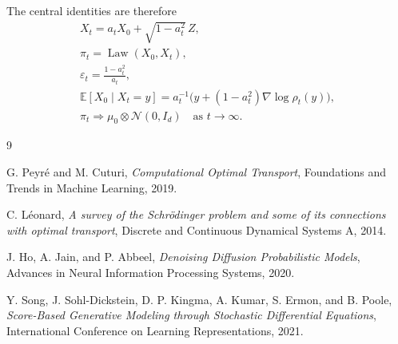 \documentclass[11pt]{article}
\theoremstyle{remark}
\newcommand{\E}{\mathbb{E}}
\newcommand{\N}{\mathcal{N}}
\newcommand{\Law}{\operatorname{Law}}
\begin{document}
The central identities are therefore
\begin{equation}
  \boxed{
  \begin{gathered}
  X_t=a_tX_0+\sqrt{1-a_t^2}\,Z,\\
  \pi_t=\Law(X_0,X_t),\\
  \varepsilon_t=\frac{1-a_t^2}{a_t},\\
  \E[X_0\mid X_t=y]
  =a_t^{-1}\bigl(y+(1-a_t^2)\nabla\log\rho_t(y)\bigr),\\
  \pi_t\Longrightarrow\mu_0\otimes\N(0,I_d)
  \quad\text{as }t\to\infty.
  \end{gathered}}
\end{equation}

\begin{thebibliography}{9}
\small
\setlength{\itemsep}{0.35\baselineskip}

G. Peyr\'e and M. Cuturi,
\emph{Computational Optimal Transport},
Foundations and Trends in Machine Learning, 2019.

C. L\'eonard,
\emph{A survey of the Schr\"odinger problem and some of its connections with
optimal transport},
Discrete and Continuous Dynamical Systems A, 2014.

J. Ho, A. Jain, and P. Abbeel,
\emph{Denoising Diffusion Probabilistic Models},
Advances in Neural Information Processing Systems, 2020.

Y. Song, J. Sohl-Dickstein, D. P. Kingma, A. Kumar, S. Ermon, and B. Poole,
\emph{Score-Based Generative Modeling through Stochastic Differential
Equations},
International Conference on Learning Representations, 2021.

\end{thebibliography}
\end{document}
